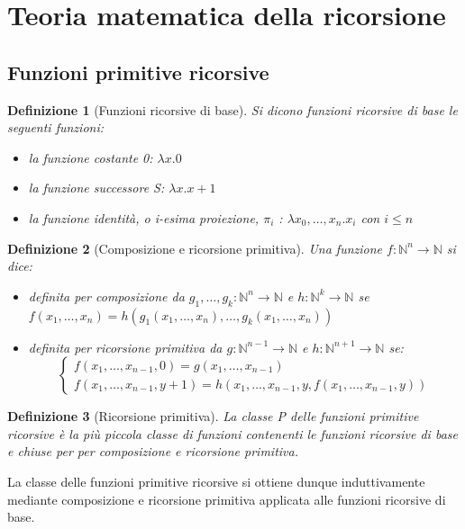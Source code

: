 \documentclass[a4paper,titlepage]{article}
\newtheorem{definition}{Definizione}[section]
\theoremstyle{definition}
\newcommand{\N}{\mathbb{N}}
\begin{document}
\section{Teoria matematica della ricorsione}
\subsection{Funzioni primitive ricorsive}
\begin{definition}[Funzioni ricorsive di base]
	Si dicono funzioni ricorsive di base le seguenti funzioni:
	\begin{itemize}
		\item la funzione costante 0: $\lambda x.0$
		\item la funzione successore S: $\lambda x.x+1$
		\item la funzione identità, o i-esima proiezione, $\pi_i$ : $\lambda x_0,\dots,x_n.x_i$ con $i\leq n$
	\end{itemize}
\end{definition}

\begin{definition}[Composizione e ricorsione primitiva]
	Una funzione $f: \mathbb{N}^n\longrightarrow\mathbb{N}$ si dice:
	\begin{itemize}
		\item definita per composizione da $g_1,\dots,g_k:\N^n\longrightarrow\N$ e $h:\N^k\longrightarrow\N$ se $f(x_1,\dots,x_n) = h(g_1(x_1,\dots,x_n),\dots,g_k(x_1,\dots,x_n))$
		\item definita per ricorsione primitiva da $g:\N^{n-1}\longrightarrow\N$ e $h:\N^{n+1}\longrightarrow\N$ se:
		\[	
			\begin{cases}
				f(x_1,\dots,x_{n-1},0)= g(x_1,\dots,x_{n-1})\\
				f(x_1,\dots,x_{n-1}, y+1)=h(x_1,\dots,x_{n-1},y,f(x_1,\dots,x_{n-1},y))
			\end{cases}
		\]
	\end{itemize}
\end{definition}

\begin{definition}[Ricorsione primitiva]
	La classe P delle funzioni primitive ricorsive è la più piccola classe di funzioni contenenti le funzioni ricorsive di base e chiuse per per composizione e ricorsione primitiva.
\end{definition}

La classe delle funzioni primitive ricorsive si ottiene dunque induttivamente mediante composizione e ricorsione primitiva applicata alle funzioni ricorsive di base. 
\end{document}
